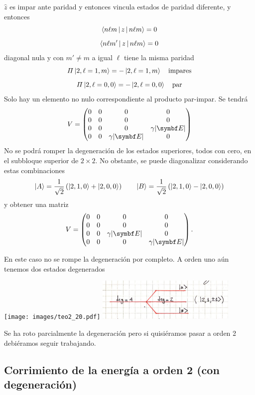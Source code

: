 \documentclass[10pt,oneside]{CBFT_book}
\begin{document}
$\hat{z}$ es impar ante paridad y entonces vincula estados de paridad diferente,
y entonces 
\[
	\Braket{n\ell m|z|n\ell m} = 0 
\]
\[
	\Braket{n\ell m'|z|n\ell m} = 0 
\]
diagonal nula y con $m'\neq m$ a igual $\ell$ tiene la misma paridad
\[
	\Pi \Ket{2,\ell=1,m} = -\Ket{2,\ell=1,m} \quad \text{impares}
\]
\[
	\Pi \Ket{2,\ell=0,0} = -\Ket{2,\ell=0,0} \quad \text{par}
\]
Solo hay un elemento no nulo correspondiente al producto par-impar.
Se tendrá 
\[
	V = \begin{pmatrix}
	   0 & 0 & 0 & 0 \\
	   0 & 0 & 0 & 0 \\
	   0 & 0 & 0 & \gamma|\vb{E}| \\
	   0 & 0 & \gamma|\vb{E}| & 0
	  \end{pmatrix}
\]
No se podrá romper la degeneración de los estados superiores, todos con cero,
en el subbloque superior de $2\times 2$.
No obstante, se puede diagonalizar considerando estas combinaciones
\[
	\Ket{A} = \frac{1}{\sqrt{2}} \left( \Ket{2,1,0} + \Ket{2,0,0} \right)
	\qquad
	\Ket{B} = \frac{1}{\sqrt{2}} \left( \Ket{2,1,0} - \Ket{2,0,0} \right)
\]
y obtener una matriz
\[
	V = \begin{pmatrix}
	   0 & 0 & 0 & 0 \\
	   0 & 0 & 0 & 0 \\
	   0 & 0 & \gamma|\vb{E}| & 0 \\	   
	   0 & 0 & 0 & \gamma|\vb{E}| 
	  \end{pmatrix}.
\]

En este caso no se rompe la degeneración por completo.
A orden uno aún tenemos dos estados degenerados

	\texttt{[image: images/teo2\_20.pdf]}
	\includegraphics[width=0.5\textwidth]{images/fig_ft2_degeneracion_3.jpg}

Se ha roto parcialmente la degeneración pero si quisiéramos pasar a orden 2 debiéramos
seguir trabajando.

\subsection{Corrimiento de la energía a orden 2 (con degeneración)}
\end{document}
